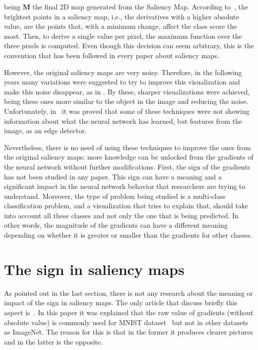 \documentclass[preprint,12pt]{elsarticle}
\begin{document}
being $\boldsymbol{M}$ the final 2D map generated from the Saliency Map. According to~\cite{Simonyan2014}, the brightest points in a saliency map, i.e., the derivatives with a higher absolute value, are the points that, with a minimum change, affect the class score the most. Then, to derive a single value per pixel, the maximum function over the three pixels is computed. Even though this decision can seem arbitrary, this is the convention that has been followed in every paper about saliency maps.

However, the original saliency maps are very noisy. Therefore, in the following years many variations were suggested to try to improve this visualization and make this noise disappear, as in \cite{Springenberg2015, Sundararajan2017, Shrikumar2017}. By these, sharper visualizations were achieved, being these ones more similar to the object in the image and reducing the noise. Unfortunately, in~\cite{Adebayo2018} it was proved that some of these techniques were not showing information about what the neural network has learned, but features from the image, as an edge detector. 

Nevertheless, there is no need of using these techniques to improve the ones from the original saliency maps: more knowledge can be unlocked from the gradients of the neural network without further modifications. First, the sign of the gradients has not been studied in any paper. This sign can have a meaning and a significant impact in the neural network behavior that researchers are trying to understand. Moreover, the type of problem being studied is a multi-class classification problem, and a visualization that tries to explain that, should take into account all these classes and not only the one that is being predicted. In other words, the magnitude of the gradients can have a different meaning depending on whether it is greater or smaller than the gradients for other classes. 

\section{The sign in saliency maps}
\label{sec:the sign in saliency maps}
As pointed out in the last section, there is not any research about the meaning or impact of the sign in saliency maps. The only article that discuss briefly this aspect is~\cite{Smilkov2017}. In this paper it was explained that the raw value of gradients (without absolute value) is commonly used for MNIST dataset~\cite{MNISTHandwrittenDigit} but not in other datasets as ImageNet. The reason for this is that in the former it produces clearer pictures and in the latter is the opposite. 
\end{document}
